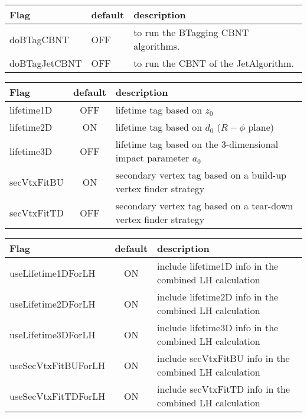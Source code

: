 \documentclass[a4paper,12pt]{article}
\begin{document}
\begin{appendix}
\begin{tabular}{l|l|l}
  Flag & default & description\\ \hline
  doBTagCBNT & OFF & to run the BTagging CBNT algorithms.\\
  doBTagJetCBNT & OFF & to run the CBNT of the JetAlgorithm.\\
\end{tabular} 

\begin{tabular}{l|c|l}
Flag & default & description\\ \hline
lifetime1D & OFF & lifetime tag based on $z_0$\\
lifetime2D & ON & lifetime tag based on $d_0$ ($R-\phi$ plane)\\
lifetime3D & OFF & lifetime tag based on the 3-dimensional impact parameter $a_0$\\
secVtxFitBU & ON & secondary vertex tag based on a build-up vertex finder strategy\\
secVtxFitTD & OFF & secondary vertex tag based on a tear-down vertex finder strategy\\
\end{tabular} 

\begin{tabular}{l|c|l}
Flag & default & description\\
\hline
useLifetime1DForLH & ON & include lifetime1D info in the combined LH calculation\\
useLifetime2DForLH & ON & include lifetime2D info in the combined LH calculation\\
useLifetime3DForLH & ON & include lifetime3D info in the combined LH calculation\\
useSecVtxFitBUForLH & ON & include secVtxFitBU info in the combined LH calculation\\
useSecVtxFitTDForLH & ON & include secVtxFitTD info in the combined LH calculation\\
\end{tabular} 


\end{appendix}
\end{document}
